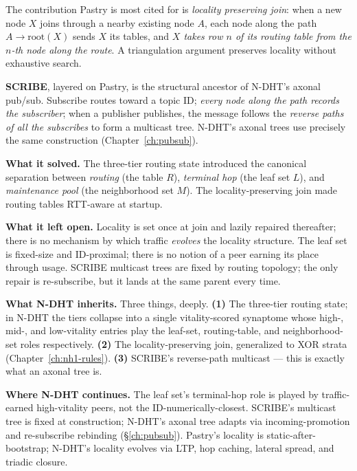 \documentclass[twoside,nobib]{tufte-book}
\newcommand{\NDHT}{N-DHT\xspace}
\begin{document}
The contribution Pastry is most cited for is \emph{locality
preserving join}: when a new node $X$ joins through a nearby
existing node $A$, each node along the path $A \to \mathrm{root}(X)$
sends $X$ its tables, and \emph{$X$ takes row $n$ of its routing
table from the $n$-th node along the route}. A triangulation
argument preserves locality without exhaustive search.

\textbf{SCRIBE}, layered on Pastry, is
the structural ancestor of \NDHT's axonal pub/sub. Subscribe routes
toward a topic ID; \emph{every node along the path records the
subscriber}; when a publisher publishes, the message follows the
\emph{reverse paths of all the subscribes} to form a multicast
tree. \NDHT's axonal trees use precisely the same construction
(Chapter~\ref{ch:pubsub}).

\textbf{What it solved.} The three-tier routing state introduced
the canonical separation between \emph{routing} (the table $R$),
\emph{terminal hop} (the leaf set $L$), and \emph{maintenance pool}
(the neighborhood set $M$). The locality-preserving join made
routing tables RTT-aware at startup.

\textbf{What it left open.} Locality is set once at join and lazily
repaired thereafter; there is no mechanism by which traffic
\emph{evolves} the locality structure. The leaf set is fixed-size
and ID-proximal; there is no notion of a peer earning its place
through usage. SCRIBE multicast trees are fixed by routing
topology; the only repair is re-subscribe, but it lands at the
same parent every time.

\textbf{What \NDHT inherits.} Three things, deeply. \textbf{(1)} The
three-tier routing state; in \NDHT the tiers collapse into a
single vitality-scored synaptome whose high-, mid-, and
low-vitality entries play the leaf-set, routing-table, and
neighborhood-set roles respectively. \textbf{(2)} The
locality-preserving join, generalized to XOR strata
(Chapter~\ref{ch:nh1-rules}). \textbf{(3)} SCRIBE's reverse-path
multicast --- this is exactly what an axonal tree is.

\textbf{Where \NDHT continues.} The leaf set's terminal-hop role is
played by traffic-earned high-vitality peers, not the
ID-numerically-closest. SCRIBE's multicast tree is fixed at
construction; \NDHT's axonal tree adapts via incoming-promotion and
re-subscribe rebinding (\S\ref{ch:pubsub}). Pastry's locality is
static-after-bootstrap; \NDHT's locality evolves via LTP, hop
caching, lateral spread, and triadic closure.
\end{document}
